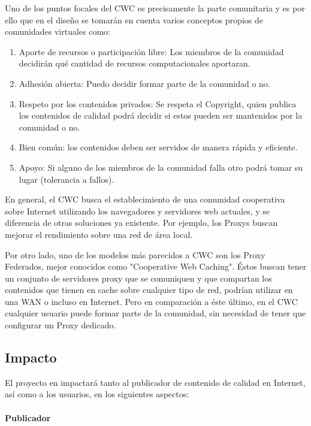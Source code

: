 Uno de los puntos focales del CWC es precisamente la parte comunitaria y es por ello que en el diseño se tomarán en cuenta varios conceptos propios de comunidades virtuales como: 

\begin{enumerate}
\item Aporte de recursos o participación libre: Los miembros de la comunidad decidirán qué cantidad de recursos computacionales aportaran.
\item Adhesión abierta: Puedo decidir formar parte de la comunidad o no.
\item Respeto por los contenidos privados: Se respeta el Copyright, quien publica los contenidos de calidad podrá decidir si estos pueden ser mantenidos por la comunidad o no.
\item Bien común: los contenidos deben ser servidos de manera rápida y eficiente.
\item Apoyo: Si alguno de los miembros de la comunidad falla otro podrá tomar su lugar (tolerancia a fallos).
\end{enumerate}

En general, el CWC busca el establecimiento de una comunidad cooperativa sobre Internet utilizando los navegadores y servidores web actuales, y se diferencia de otras soluciones ya existente. Por ejemplo, los Proxys buscan mejorar el rendimiento sobre una red de área local. 

Por otro lado, uno de los modelos más parecidos a CWC son los Proxy Federados, mejor conocidos como "Cooperative Web Caching". Éstos buscan tener un conjunto de servidores proxy que se comuniquen y que compartan los contenidos que tienen en cache sobre cualquier tipo de red, podrían utilizar en una WAN o incluso en Internet. Pero en comparación a éste último, en el CWC cualquier usuario puede formar parte de la comunidad, sin necesidad de tener que configurar un Proxy dedicado.


\subsection{Impacto}


El proyecto en impactará tanto al publicador de contenido de calidad en Internet, así como a los usuarios, en los siguientes aspectos:

\paragraph{Publicador}


